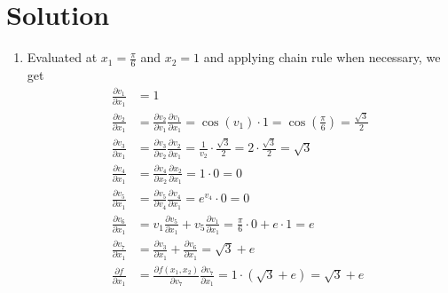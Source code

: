 \documentclass[submit]{../harvardml}
\newenvironment{answer}
  {\section*{Solution}}
{}
\begin{document}
\begin{answer}
\begin{enumerate}
\begin{enumerate}
            \item Evaluated at $x_1 = \frac{\pi}{6}$ and $x_2 = 1$ and applying chain rule when necessary, we get
                  \begin{align*}
                    \frac{\partial v_1}{\partial x_1} & = 1\\
                    \frac{\partial v_2}{\partial x_1} & = \frac{\partial v_2}{\partial v_1} \frac{\partial v_1}{\partial x_1} = \cos(v_1) \cdot 1 = \cos (\frac{\pi}{6}) = \frac{\sqrt{3}}{2}\\
                    \frac{\partial v_3}{\partial x_1} & = \frac{\partial v_3}{\partial v_2} \frac{\partial v_2}{\partial x_1} = \frac{1}{v_2}\cdot \frac{\sqrt{3}}{2} = 2\cdot \frac{\sqrt{3}}{2} = \sqrt{3}\\
                    \frac{\partial v_4}{\partial x_1} & = \frac{\partial v_4}{\partial x_2} \frac{\partial x_2}{\partial x_1} = 1 \cdot 0 = 0\\
                    \frac{\partial v_5}{\partial x_1} & = \frac{\partial v_5}{\partial v_4} \frac{\partial v_4}{\partial x_1} = e^{v_4} \cdot 0 = 0\\
                    \frac{\partial v_6}{\partial x_1} & = v_1\frac{\partial v_5}{\partial x_1} + v_5\frac{\partial v_1}{\partial x_1} = \frac{\pi}{6} \cdot 0 + e \cdot 1 = e\\
                    \frac{\partial v_7}{\partial x_1} & = \frac{\partial v_3}{\partial x_1} + \frac{\partial v_6}{\partial x_1} = \sqrt{3} + e\\
                    \frac{\partial f}{\partial x_1}   & =\frac{\partial f(x_1,x_2)}{\partial v_7} \frac{\partial v_7}{\partial x_1} = 1 \cdot (\sqrt{3} + e) = \sqrt{3} + e
                  \end{align*}
          \end{enumerate}

  \end{enumerate}
\end{answer}


\newpage

\end{document}
